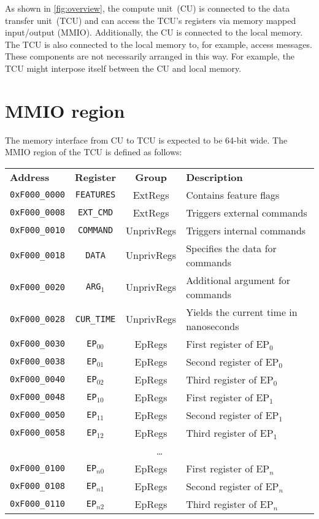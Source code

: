 \documentclass[a4paper,11pt,draft]{article}
\newcommand{\rref}[2][]{\autoref{#2}}
\begin{document}
As shown in \rref{fig:overview}, the compute unit~(CU) is connected to the data transfer unit~(TCU)
and can access the TCU's registers via memory mapped input/output (MMIO). Additionally, the CU is
connected to the local memory. The TCU is also connected to the local memory to, for example, access
messages. These components are not necessarily arranged in this way. For example, the TCU might
interpose itself between the CU and local memory.

\section{MMIO region}

The memory interface from CU to TCU is expected to be 64-bit wide. The MMIO region of the TCU is
defined as follows:

\vspace{2ex}
\noindent
\begin{tabular}{ p{3cm} | c | c | l }
  \textbf{Address} & \textbf{Register} & \textbf{Group} & \textbf{Description} \\
  \texttt{0xF000\_0000} & \texttt{FEATURES} & ExtRegs & Contains feature flags \\
  \hline
  \texttt{0xF000\_0008} & \texttt{EXT\_CMD} & ExtRegs & Triggers external commands \\
  \hline
  \texttt{0xF000\_0010} & \texttt{COMMAND} & UnprivRegs & Triggers internal commands \\
  \hline
  \texttt{0xF000\_0018} & \texttt{DATA} & UnprivRegs & Specifies the data for commands \\
  \hline
  \texttt{0xF000\_0020} & \texttt{ARG$_1$} & UnprivRegs & Additional argument for commands \\
  \hline
  \texttt{0xF000\_0028} & \texttt{CUR\_TIME} & UnprivRegs & Yields the current time in nanoseconds \\
  \hline
  \texttt{0xF000\_0030} & \texttt{EP$_{00}$} & EpRegs & First register of EP$_0$ \\
  \texttt{0xF000\_0038} & \texttt{EP$_{01}$} & EpRegs & Second register of EP$_0$ \\
  \texttt{0xF000\_0040} & \texttt{EP$_{02}$} & EpRegs & Third register of EP$_0$ \\
  \hline
  \texttt{0xF000\_0048} & \texttt{EP$_{10}$} & EpRegs & First register of EP$_1$ \\
  \texttt{0xF000\_0050} & \texttt{EP$_{11}$} & EpRegs & Second register of EP$_1$ \\
  \texttt{0xF000\_0058} & \texttt{EP$_{12}$} & EpRegs & Third register of EP$_1$ \\
  \hline
  \multicolumn{4}{c}{\dots} \\
  \hline
  \texttt{0xF000\_0100} & \texttt{EP$_{n0}$} & EpRegs & First register of EP$_{n}$ \\
  \texttt{0xF000\_0108} & \texttt{EP$_{n1}$} & EpRegs & Second register of EP$_{n}$ \\
  \texttt{0xF000\_0110} & \texttt{EP$_{n2}$} & EpRegs & Third register of EP$_{n}$ \\
\end{tabular}
\end{document}
